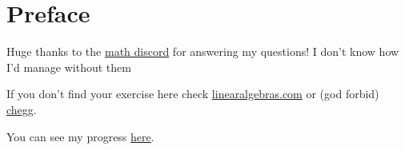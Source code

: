 \documentclass[titlepage,12pt]{book}
\begin{document}
\maketitle
\frontmatter

\chapter*{Preface}
Huge thanks to the \href{https://discord.com/invite/math}{math discord} for answering my questions! I don't know how I'd manage without them \heart
\par

If you don't find your exercise here check \href{https://linearalgebras.com/solution-understanding-analysis.html}{linearalgebras.com} or (god forbid) \href{https://www.chegg.com/homework-help/understanding-analysis-2nd-edition-solutions-9781493927111}{chegg}.
\par
You can see my progress \href{https://www.beeminder.com/valvate/abbott-tex-exercises}{here}.

\tableofcontents
\mainmatter





\end{document}
